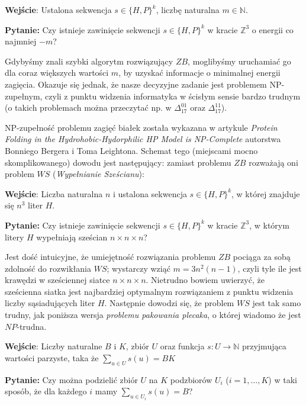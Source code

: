 \documentclass[leqno,10pt]{article}
\begin{document}
\begin{mdframed}
\textbf{Wejście}: Ustalona sekwencja $s \in \{H,P\}^{k}$, liczbę naturalna $m \in \mathbb{N}$.

\textbf{Pytanie:} Czy istnieje zawinięcie sekwencji $s \in \{H,P\}^{k}$ w kracie $
\mathbb{Z}^3$ o energii co najmniej $-m$? 
\end{mdframed}

Gdybyśmy znali szybki algorytm rozwiązujący $ZB$, moglibyśmy
uruchamiać go dla coraz większych wartości $m$, by uzyskać informacje o
minimalnej energii zagięcia. Okazuje się jednak, że nasze decyzyjne zadanie jest
problemem NP-zupełnym, czyli z punktu widzenia informatyka w ścisłym sensie
bardzo trudnym (o takich problemach można przeczytać np. w
$\Delta^{01}_{17}$ oraz $\Delta^{11}_{17}$). 

NP-zupełność problemu zagięć białek
została wykazana w artykule \textit{Protein Folding in the Hydrohobic-Hydorphilic HP
Model is NP-Complete} autorstwa Bonniego Bergera i Toma Leightona. 
Schemat tego (miejscami mocno skomplikowanego) dowodu jest następujący: zamiast
problemu $ZB$ rozważają oni problem $WS$ (\textit{Wypełnianie Sześcianu}):
\begin{mdframed}
\textbf{Wejście}: Liczba naturalna $n$ i ustalona sekwencja $s \in \{H,P\}^{k}$, w której znajduje się
$n^3$ liter $H$.

\textbf{Pytanie:} Czy istnieje zawinięcie sekwencji $s \in \{H,P\}^{k}$ w kracie $
\mathbb{Z}^3$, w którym litery $H$ wypełniają sześcian $n\times n\times n$? 
\end{mdframed}

Jest dość intuicyjne, że umiejętność rozwiązania problemu $ZB$ pociąga za sobą
zdolność do rozwikłania $WS$; wystarczy wziąć $m=3n^2(n-1)$, czyli tyle ile jest
krawędzi w sześciennej siatce $n\times n\times n$. Nietrudno bowiem uwierzyć, że
sześcienna siatka jest najbardziej optymalnym rozwiązaniem z punktu widzenia
liczby sąsiadujących liter $H$. Następnie dowodzi się, że problem $WS$ jest tak
samo trudny, jak poniższa wersja \textit{problemu pakowania plecaka}, o
której wiadomo że jest $NP$-trudna.

\begin{mdframed}
\textbf{Wejście}: 
Liczby naturalne $B$ i $K$, zbiór $U$ oraz funkcja $s\colon U\to
\mathbb{N}$ przyjmująca wartości parzyste, taka że $\sum_{u\in U} s(u)=BK$

\textbf{Pytanie:} Czy można podzielić zbiór $U$ na $K$ podzbiorów $U_i$
($i=1,\ldots,K$) w taki sposób, że dla każdego $i$ mamy $\sum_{u\in U_i}
s(u)=B$?
\end{mdframed}
\end{document}
